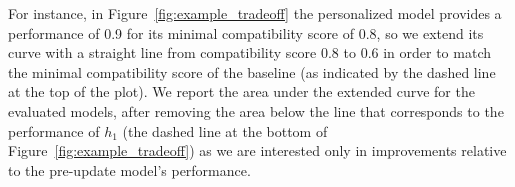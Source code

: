 \documentclass[letterpaper]{article} %
\theoremstyle{definition}
\begin{document}
For instance, in  Figure~\ref{fig:example_tradeoff} the personalized model provides a performance of 0.9 for its minimal compatibility score of 0.8, so we extend its curve with a straight line from compatibility score 0.8 to 0.6 in order to match the minimal compatibility score of the baseline (as indicated by the dashed line at the top of the plot). We report the area under the extended curve for the evaluated models, after removing the area below the line that corresponds to the performance of $h_1$ (the dashed line at the bottom of Figure~\ref{fig:example_tradeoff}) as we are interested only in improvements relative to the pre-update model's performance.






%


\end{document}
